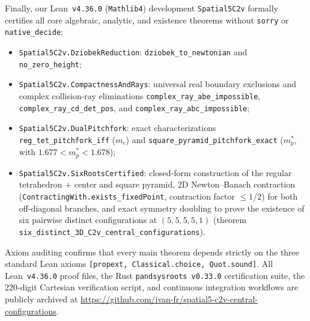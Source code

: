 \documentclass[11pt,a4paper]{amsart}
\theoremstyle{definition}
\theoremstyle{remark}
\begin{document}
Finally, our Lean~\texttt{v4.36.0} (\texttt{Mathlib4}) development
\texttt{Spatial5C2v} formally certifies all core algebraic, analytic, and existence
theorems without \texttt{sorry} or \texttt{native\_decide}:
\begin{itemize}
  \item \texttt{Spatial5C2v.DziobekReduction}: \texttt{dziobek\_to\_newtonian} and
        \texttt{no\_zero\_height};
  \item \texttt{Spatial5C2v.CompactnessAndRays}: universal real boundary exclusions and
        complex collision-ray eliminations \texttt{complex\_ray\_abe\_impossible},
        \texttt{complex\_ray\_cd\_det\_pos}, and \texttt{complex\_ray\_abc\_impossible};
  \item \texttt{Spatial5C2v.DualPitchfork}: exact characterizations
        \texttt{reg\_tet\_pitchfork\_iff} ($m_c$) and
        \texttt{square\_pyramid\_pitchfork\_exact} ($m_p^*$, with $1.677 < m_p^* < 1.678$);
  \item \texttt{Spatial5C2v.SixRootsCertified}: closed-form construction of the
        regular tetrahedron + center and square pyramid, 2D Newton--Banach contraction
        (\texttt{ContractingWith.exists\_fixedPoint}, contraction factor $\le 1/2$) for
        both off-diagonal branches, and exact symmetry doubling to prove the existence
        of six pairwise distinct configurations at $(5,5,5,5,1)$
        (theorem \texttt{\small six\_distinct\_3D\_C2v\_central\_configurations}).
\end{itemize}
Axiom auditing confirms that every main theorem depends strictly on the three standard
Lean axioms \texttt{[propext, Classical.choice, Quot.sound]}.
All Lean~\texttt{v4.36.0} proof files, the Rust \texttt{pandsysroots v0.33.0}
certification suite, the 220-digit Cartesian verification script, and continuous
integration workflows are publicly archived at
\url{https://github.com/ivan-fr/spatial5-c2v-central-configurations}.
\end{document}
